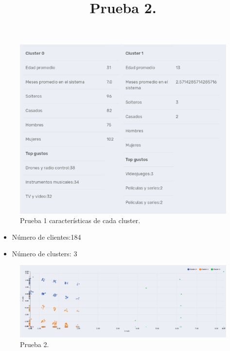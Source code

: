 \FloatBarrier
\begin{figure}[htbp!]
		\centering
			\includegraphics[width=1 \textwidth]{imagenes/pruebassistemarecom/cluster2_2}
		\caption{Prueba 1 características de cada cluster.}
\end{figure}
\FloatBarrier


\title{\textbf{Prueba 2.}}

\begin{itemize}
\item Número de clientes:184
\item Número de clusters: 3
\end{itemize}

\FloatBarrier
\begin{figure}[htbp!]
		\centering
			\includegraphics[width=1 \textwidth]{imagenes/pruebassistemarecom/cluster3_1}
		\caption{Prueba 2.}
		\label{PA:pruebafinal}
\end{figure}
\FloatBarrier

